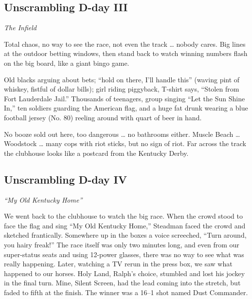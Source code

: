 \documentclass[10pt,a4paper]{article}
\begin{document}
%
%

\subsection{Unscrambling D-day III}
\emph{The Infield}

Total chaos, no way to see the race, not even the track … nobody cares. Big lines at the outdoor betting windows, then stand back to watch winning numbers flash on the big board, like a giant bingo game.

Old blacks arguing about bets; “hold on there, I’ll handle this” (waving pint of whiskey, fistful of dollar bills); girl riding piggyback, T-shirt says, “Stolen from Fort Lauderdale Jail.” Thousands of teenagers, group singing “Let the Sun Shine In,” ten soldiers guarding the American flag, and a huge fat drunk wearing a blue football jersey (No. 80) reeling around with quart of beer in hand.

No booze sold out here, too dangerous … no bathrooms either. Muscle Beach … Woodstock … many cops with riot sticks, but no sign of riot. Far across the track the clubhouse looks like a postcard from the Kentucky Derby.

\subsection{Unscrambling D-day IV}
\emph{“My Old Kentucky Home”}

We went back to the clubhouse to watch the big race. When the crowd stood to face the flag and sing “My Old Kentucky Home,” Steadman faced the crowd and sketched frantically. Somewhere up in the boxes a voice screeched, “Turn around, you hairy freak!” The race itself was only two minutes long, and even from our super-status seats and using 12-power glasses, there was no way to see what was really happening. Later, watching a TV rerun in the press box, we saw what happened to our horses. Holy Land, Ralph’s choice, stumbled and lost his jockey in the final turn. Mine, Silent Screen, had the lead coming into the stretch, but faded to fifth at the finish. The winner was a 16–1 shot named Dust Commander.
\end{document}
